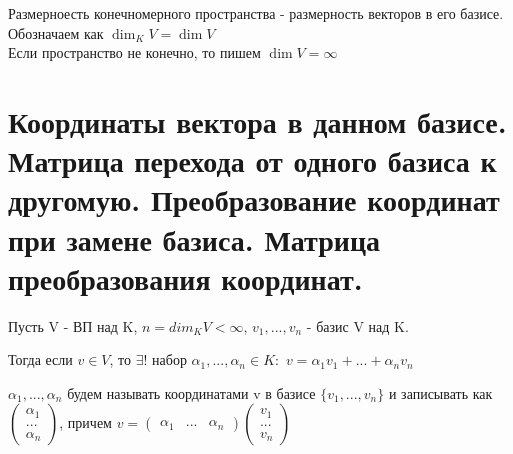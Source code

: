 \documentclass[12pt, fleqn]{article}
\begin{document}
		\begin{definition}
				Размерноесть конечномерного пространства - размерность векторов в его базисе.\\
        Обозначаем как $\dim_K V = \dim V$\\
        Если пространство не конечно, то пишем $\dim V = \infty$
		\end{definition}


\section{Координаты вектора в данном базисе. Матрица перехода от одного базиса к другомую. Преобразование координат при замене базиса. Матрица преобразования координат.}
        \begin{theorem}
        Пусть V - ВП над K, $n = dim_K V < \infty$, $v_1, ..., v_n$ - базис V над K.

        Тогда если $v \in V$, то $\exists!$ набор $\alpha_1, ..., \alpha_n \in K:$ $v=\alpha_1 v_1+...+\alpha_n v_n$
        \end{theorem}

        \begin{definition}
        $\alpha_1,...,\alpha_n$ будем называть координатами v в базисе $\{v_1,...,v_n\}$ и записывать как
        $\begin{pmatrix}
        \alpha_1\\
        ...\\
        \alpha_n
        \end{pmatrix}$, причем $v=
        \begin{pmatrix} \alpha_1&...&\alpha_n \end{pmatrix}
        \begin{pmatrix}
        v_1\\
        ...\\
        v_n
        \end{pmatrix}$
        \end{definition}
\end{document}
